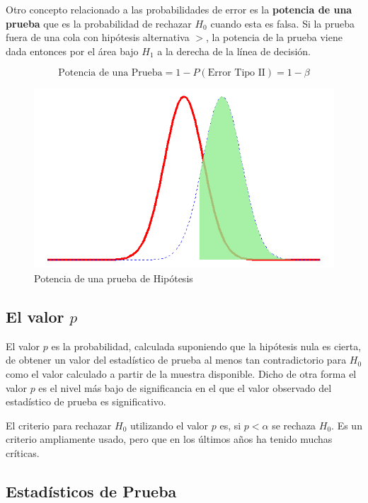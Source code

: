 \documentclass[letterpaper,]{book}
\begin{document}
Otro concepto relacionado a las probabilidades de error es la \textbf{potencia de una prueba} que es la probabilidad de rechazar \(H_0\) cuando esta es falsa. Si la prueba fuera de una cola con hipótesis alternativa \(>\), la potencia de la prueba viene dada entonces por el área bajo \(H_1\) a la derecha de la línea de decisión.

\begin{equation} 
\text{Potencia de una Prueba}=1-P\left(\text{Error Tipo II}\right)=1-\beta
\label{eq:power}
\end{equation}

\begin{figure}[h!]

{\centering \includegraphics[width=0.6\linewidth]{power} 

}

\caption{Potencia de una prueba de Hipótesis}\label{fig:power}
\end{figure}

\hypertarget{pvalor}{%
\subsection{\texorpdfstring{El valor \(p\)}{El valor p}}\label{pvalor}}

El valor \(p\) es la probabilidad, calculada suponiendo que la hipótesis nula es cierta, de obtener un valor del estadístico de prueba al menos tan contradictorio para \(H_0\) como el valor calculado a partir de la muestra disponible. Dicho de otra forma el valor \(p\) es el nivel más bajo de significancia en el que el valor observado del estadístico de prueba es significativo.

El criterio para rechazar \(H_0\) utilizando el valor \(p\) es, si \(p<\alpha\) se rechaza \(H_0\). Es un criterio ampliamente usado, pero que en los últimos años ha tenido muchas críticas.

\hypertarget{estadisticos-de-prueba}{%
\subsection{Estadísticos de Prueba}\label{estadisticos-de-prueba}}
\end{document}
